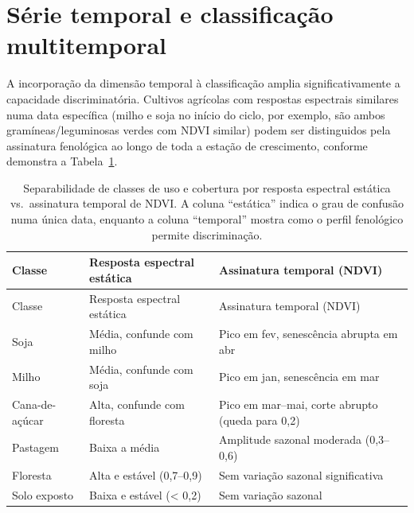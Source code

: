 \documentclass[
  portuguese,
  11pt,
  a4paper,
  open=any]{scrbook}
\begin{document}
\section{Série temporal e classificação
multitemporal}\label{suxe9rie-temporal-e-classificauxe7uxe3o-multitemporal}

A incorporação da dimensão temporal à classificação amplia
significativamente a capacidade discriminatória. Cultivos agrícolas com
respostas espectrais similares numa data específica (milho e soja no
início do ciclo, por exemplo, são ambos gramíneas/leguminosas verdes com
NDVI similar) podem ser distinguidos pela assinatura fenológica ao longo
de toda a estação de crescimento, conforme demonstra a
Tabela~\ref{tbl-separabilidade}.

\begin{longtable}[]{@{}
  >{\raggedright\arraybackslash}p{}
  >{\centering\arraybackslash}p{}
  >{\centering\arraybackslash}p{}@{}}
\caption{Separabilidade de classes de uso e cobertura por resposta
espectral estática vs.~assinatura temporal de NDVI. A coluna
``estática'' indica o grau de confusão numa única data, enquanto a
coluna ``temporal'' mostra como o perfil fenológico permite
discriminação.}\label{tbl-separabilidade}\tabularnewline
\toprule\noalign{}
\begin{minipage}[b]{\linewidth}\raggedright
Classe
\end{minipage} & \begin{minipage}[b]{\linewidth}\centering
Resposta espectral estática
\end{minipage} & \begin{minipage}[b]{\linewidth}\centering
Assinatura temporal (NDVI)
\end{minipage} \\
\midrule\noalign{}
\endfirsthead
\toprule\noalign{}
\begin{minipage}[b]{\linewidth}\raggedright
Classe
\end{minipage} & \begin{minipage}[b]{\linewidth}\centering
Resposta espectral estática
\end{minipage} & \begin{minipage}[b]{\linewidth}\centering
Assinatura temporal (NDVI)
\end{minipage} \\
\midrule\noalign{}
\endhead
\bottomrule\noalign{}
\endlastfoot
Soja & Média, confunde com milho & Pico em fev, senescência abrupta em
abr \\
Milho & Média, confunde com soja & Pico em jan, senescência em mar \\
Cana-de-açúcar & Alta, confunde com floresta & Pico em mar--mai, corte
abrupto (queda para 0,2) \\
Pastagem & Baixa a média & Amplitude sazonal moderada (0,3--0,6) \\
Floresta & Alta e estável (0,7--0,9) & Sem variação sazonal
significativa \\
Solo exposto & Baixa e estável (\textless{} 0,2) & Sem variação
sazonal \\
\end{longtable}
\end{document}
